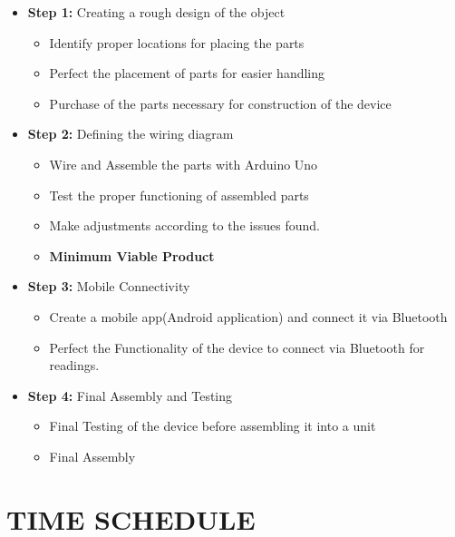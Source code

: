\documentclass[12pt,a4paper]{article}
\begin{document}
\begin{itemize}
  \item \textbf{Step 1:}  Creating a rough design of the object
  \begin{itemize}
  	\item Identify proper locations for placing the parts
	\item Perfect the placement of parts for easier handling
	\item Purchase of the parts necessary for construction of the device
  \end{itemize}
  
  \item \textbf{Step 2:} Defining the wiring diagram
  \begin{itemize}
  	\item Wire and Assemble the parts with Arduino Uno 
	\item Test the proper functioning of assembled parts
	\item Make adjustments according to the issues found.
	\item \textbf{Minimum Viable Product}
  \end{itemize}
  
  \item \textbf{Step 3:} Mobile Connectivity
  \begin{itemize}
  	\item Create a mobile app(Android application) and connect it via Bluetooth
	\item Perfect the Functionality of the device to connect via Bluetooth for readings.
  \end{itemize}
  
  \item \textbf{Step 4:} Final Assembly and Testing
  \begin{itemize}
  	\item Final Testing of the device before assembling it into a unit
	\item Final Assembly
  \end{itemize}
  
\end{itemize}
 
 
 \newpage
 
\section{\uppercase {Time Schedule}} 
\end{document}
